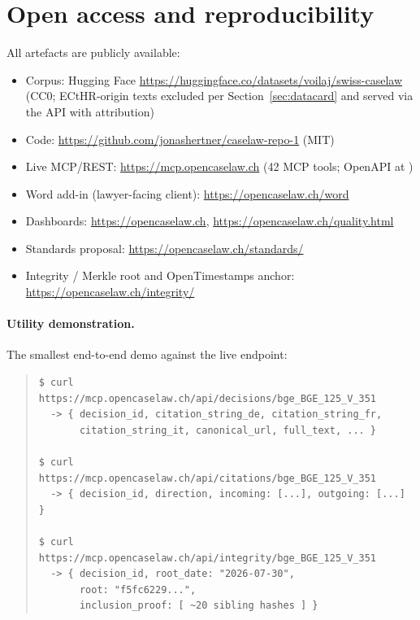 \documentclass[11pt,a4paper]{article}
\begin{document}
\section{Open access and reproducibility}\label{sec:open}

All artefacts are publicly available:
\begin{itemize}
\item Corpus: Hugging Face \url{https://huggingface.co/datasets/voilaj/swiss-caselaw} (CC0; ECtHR-origin texts excluded per Section~\ref{sec:datacard} and served via the API with attribution)
\item Code: \url{https://github.com/jonashertner/caselaw-repo-1} (MIT)
\item Live MCP/REST: \url{https://mcp.opencaselaw.ch} (42 MCP tools; OpenAPI at )
\item Word add-in (lawyer-facing client): \url{https://opencaselaw.ch/word}
\item Dashboards: \url{https://opencaselaw.ch}, \url{https://opencaselaw.ch/quality.html}
\item Standards proposal: \url{https://opencaselaw.ch/standards/}
\item Integrity / Merkle root and OpenTimestamps anchor: \url{https://opencaselaw.ch/integrity/}
\end{itemize}

\paragraph{Utility demonstration.} The smallest end-to-end demo against the live endpoint:

\begin{quote}\small
\begin{verbatim}
$ curl https://mcp.opencaselaw.ch/api/decisions/bge_BGE_125_V_351
  -> { decision_id, citation_string_de, citation_string_fr,
       citation_string_it, canonical_url, full_text, ... }

$ curl https://mcp.opencaselaw.ch/api/citations/bge_BGE_125_V_351
  -> { decision_id, direction, incoming: [...], outgoing: [...] }

$ curl https://mcp.opencaselaw.ch/api/integrity/bge_BGE_125_V_351
  -> { decision_id, root_date: "2026-07-30",
       root: "f5fc6229...",
       inclusion_proof: [ ~20 sibling hashes ] }
\end{verbatim}
\end{quote}
\end{document}
